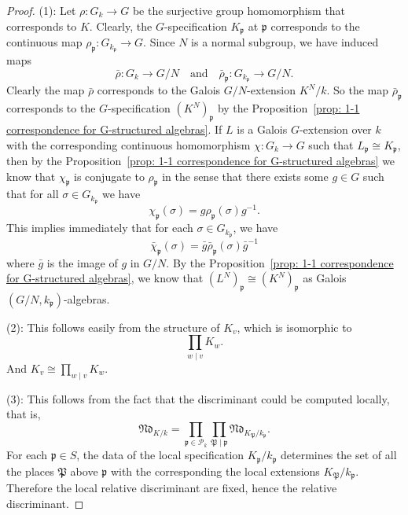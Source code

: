 \documentclass[12pt,a4paper]{amsart}
\numberwithin{equation}{section}%
\theoremstyle{plain}%
\theoremstyle{definition}%
\theoremstyle{remark}%
\begin{document}
	\begin{proof}
		(1):
		Let $\rho:G_{k}\to G$ be the surjective group homomorphism that corresponds to $K$.
		Clearly, the $G$-specification $K_{\mathfrak{p}}$ at $\mathfrak{p}$ corresponds to the continuous map $\rho_{\mathfrak{p}}:G_{k_{\mathfrak{p}}}\to G$.
		Since $N$ is a normal subgroup, we have induced maps
		\begin{equation*}
			\bar{\rho}:G_{k}\to G/N\quad\text{and}\quad\bar{\rho}_{\mathfrak{p}}:G_{k_{\mathfrak{p}}}\to G/N.
		\end{equation*}
		Clearly the map $\bar{\rho}$ corresponds to the Galois $G/N$-extension $K^N/k$.
		So the map $\bar{\rho}_{\mathfrak{p}}$ corresponds to the $G$-specification $(K^{N})_{\mathfrak{p}}$ by the Proposition~\ref{prop: 1-1 correspondence for G-structured algebras}.
		If $L$ is a Galois $G$-extension over $k$ with the corresponding continuous homomorphism $\chi:G_{k}\to G$ such that $L_{\mathfrak{p}}\cong K_{\mathfrak{p}}$, then by the Proposition~\ref{prop: 1-1 correspondence for G-structured algebras} we know that $\chi_{\mathfrak{p}}$ is conjugate to $\rho_{\mathfrak{p}}$ in the sense that there exists some $g\in G$ such that for all $\sigma\in G_{k_{\mathfrak{p}}}$ we have
		\begin{equation*}
			\chi_{\mathfrak{p}}(\sigma)=g\rho_{\mathfrak{p}}(\sigma)g^{-1}.
		\end{equation*}
		This implies immediately that for each $\sigma\in G_{k_{\mathfrak{p}}}$, we have
		\begin{equation*}
			\bar{\chi}_{\mathfrak{p}}(\sigma)=\bar{g}\bar{\rho}_{\mathfrak{p}}(\sigma)\bar{g}^{-1}
		\end{equation*}
		where $\bar{g}$ is the image of $g$ in $G/N$.
		By the Proposition~\ref{prop: 1-1 correspondence for G-structured algebras}, we know that $(L^{N})_{\mathfrak{p}}\cong(K^{N})_{\mathfrak{p}}$ as Galois $(G/N,k_{\mathfrak{p}})$-algebras.
		
		(2):
		This follows easily from the structure of $K_{v}$, which is isomorphic to
		\begin{equation*}
			\prod_{w\mid v}K_{w}.
		\end{equation*}
		And $K_{v}\cong\prod_{w\mid v}K_{w}$.
		
		(3):
		This follows from the fact that the discriminant could be computed locally, that is,
		\begin{equation*}
			\mathfrak{Nd}_{K/k}=\prod_{\mathfrak{p}\in\mathcal{P}_k}\prod_{\mathfrak{P}\mid\mathfrak{p}}\mathfrak{Nd}_{K_{\mathfrak{P}}/k_{\mathfrak{p}}}.
		\end{equation*}
		For each $\mathfrak{p}\in S$, the data of the local specification $K_{\mathfrak{p}}/k_{\mathfrak{p}}$ determines the set of all the places $\mathfrak{P}$ above $\mathfrak{p}$ with the corresponding the local extensions $K_{\mathfrak{P}}/k_{\mathfrak{p}}$.
		Therefore the local relative discriminant are fixed, hence the relative discriminant.
	\end{proof}
\end{document}
